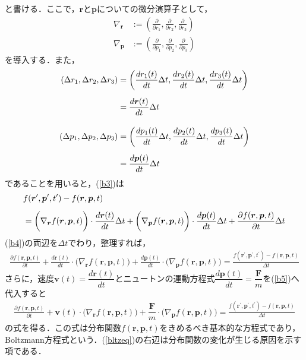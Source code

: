 と書ける．ここで，$\bm{r}$と$\bm{p}$についての微分演算子として，
　\begin{align}\label{nr}
　\nabla_{\bm{r}}&:=
\left(
\frac{\partial }{\partial r_1}
,\frac{\partial }{\partial r_2}
,\frac{\partial }{\partial r_3}
\right)\\[5pt]
\label{np}
　\nabla_{\bm{p}}&:=
\left(
\frac{\partial }{\partial p_1}
,\frac{\partial }{\partial p_2}
,\frac{\partial }{\partial p_3}
\right)
\end{align}
を導入する．また，
　　\begin{align}\label{dr}
(\Delta r_1,\Delta r_2,\Delta r_3)
&=\left(
\dfrac{dr_1(t)}{dt}\Delta t,\dfrac{dr_2(t)}{dt}\Delta t,\dfrac{dr_3(t)}{dt}\Delta t
\right)\notag\\[5pt]
&=\frac{d\bm{r}(t)}{dt}\Delta t
\\[10pt]
%
\label{dp}
\left(\Delta p_1,\Delta p_2,\Delta p_3\right)
&=\left(
\dfrac{dp_1(t)}{dt}\Delta t,\dfrac{dp_2(t)}{dt}\Delta t,\dfrac{dp_3(t)}{dt}\Delta t
\right)\notag\\[5pt]
&=\frac{d\bm{p}(t)}{dt}\Delta t
\end{align}
であることを用いると，(\ref{b3})は
　　\begin{align}\label{b4}
&f(\bm{r}^\prime,\bm{p}^\prime,t^\prime)-f(\bm{r},\bm{p},t)\notag\\[5pt]
&=
\biggl(
\nabla_{\bm{r}}f(\bm{r},\bm{p},t)
\biggr)
\cdot
\frac{d\bm{r}(t)}{dt}\Delta t
%
+
\biggl(
\nabla_{\bm{p}}f(\bm{r},\bm{p},t)
\biggr)
\cdot
\frac{d\bm{p}(t)}{dt}\Delta t
+
\frac{\partial f(\bm{r},\bm{p},t)}{\partial t}\Delta t
\end{align}
(\ref{b4})の両辺を$\Delta t$でわり，整理すれば，
%
\footnotesize
\begin{align}\label{b5}
\frac{\partial f(\bm{r},\bm{p},t)}{\partial t}
+
\frac{d\bm{r}(t)}{dt}
\cdot
\biggl(
\nabla_{\bm{r}}f(\bm{r},\bm{p},t)
\biggr)
%
+
\frac{d\bm{p}(t)}{dt}
\cdot
\biggl(
\nabla_{\bm{p}}f(\bm{r},\bm{p},t)
\biggr)
%
=
\frac
{f(\bm{r}^\prime,\bm{p}^\prime,t^\prime)-f(\bm{r},\bm{p},t)}{\Delta t}
\end{align}
\normalsize
さらに，速度$\bm{v}(t)=\dfrac{d\bm{r}(t)}{dt}$とニュートンの運動方程式$\dfrac{d\bm{p}(t)}{dt}=\dfrac{\bm{F}}{m}$を(\ref{b5})へ代入すると
\small
\begin{align}\label{bltzeq}
\frac{\partial f(\bm{r},\bm{p},t)}{\partial t}
+
\bm{v}(t)
\cdot
\biggl(
\nabla_{\bm{r}}f(\bm{r},\bm{p},t)
\biggr)
%
+
\dfrac{\bm{F}}{m}
\cdot
\biggl(
\nabla_{\bm{p}}f(\bm{r},\bm{p},t)
\biggr)
%
=
\frac
{f(\bm{r}^\prime,\bm{p}^\prime,t^\prime)-f(\bm{r},\bm{p},t)}{\Delta t}
\end{align}
\normalsize
の式を得る．この式は分布関数$f(\bm{r},\bm{p},t)$をきめるべき基本的な方程式であり，Boltzmann方程式という．(\ref{bltzeq})の右辺は分布関数の変化が生じる原因を示す項である．




　